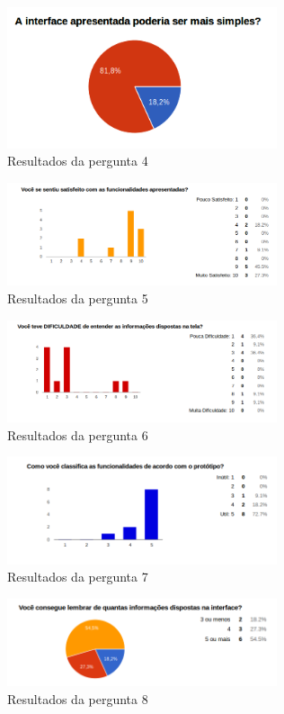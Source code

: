 \begin{figure}[!h]
  \centering
  \includegraphics[width=300px, scale=1]{figuras/result4}
  \caption{Resultados da pergunta 4}
\label{fig:result4}
\end{figure}


\begin{figure}[!h]
  \centering
  \includegraphics[width=300px, scale=1]{figuras/result5}
  \caption{Resultados da pergunta 5}
\label{fig:result5}
\end{figure}


\begin{figure}[!h]
  \centering
  \includegraphics[width=300px, scale=1]{figuras/result6}
  \caption{Resultados da pergunta 6}
\label{fig:result6}
\end{figure}


\begin{figure}[!h]
  \centering
  \includegraphics[width=300px, scale=1]{figuras/result7}
  \caption{Resultados da pergunta 7}
\label{fig:result7}
\end{figure}


\begin{figure}[!h]
  \centering
  \includegraphics[width=300px, scale=1]{figuras/result8}
  \caption{Resultados da pergunta 8}
\label{fig:result8}
\end{figure}


